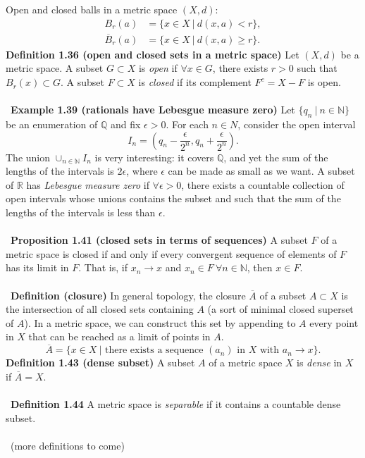 \documentclass[12 pt]{article}
\newcommand{\R}{\mathbb{R}}
\newcommand{\Q}{\mathbb{Q}}
\newcommand{\N}{\mathbb{N}}
\newcommand{\LP}{\left(}
\newcommand{\RP}{\right)}
\numberwithin{equation}{section}
\begin{document}
{Open and closed balls in a metric space $(X,d)$: \begin{align*}
B_r(a) & = \{ x \in X \ | \ d(x,a) < r \}, \\
\overline{B}_r(a) & = \{ x \in X \ | \ d(x,a) \geq r \}.
\end{align*}
\textbf{Definition 1.36 (open and closed sets in a metric space)} Let $(X, d)$ be a metric space. A subset $G \subset X$ is \textit{open} if $\forall x \in G$, there exists $r > 0$ such that $B_r(x) \subset G$. A subset $F \subset X$ is \textit{closed} if its complement $F^c = X - F$ is open.\\
\\
\
\textbf{Example 1.39 (rationals have Lebesgue measure zero)} Let $\{q_n \ | \ n \in \N\}$ be an enumeration of $\Q$ and fix $\epsilon > 0$. For each $n \in N$, consider the open interval \begin{equation*}
I_n = \LP q_n - \frac{\epsilon}{2^n}, q_n + \frac{\epsilon}{2^n} \RP.
\end{equation*}
The union $\cup_{n \in \N} I_n$ is very interesting: it covers $\Q$, and yet the sum of the lengths of the intervals is $2\epsilon$, where $\epsilon$ can be made as small as we want. A subset of $\R$ has \textit{Lebesgue measure zero} if $\forall \epsilon > 0$, there exists a countable collection of open intervals whose unions contains the subset and such that the sum of the lengths of the intervals is less than $\epsilon$.\\
\\
\
\textbf{Proposition 1.41 (closed sets in terms of sequences)} A subset $F$ of a metric space is closed if and only if every convergent sequence of elements of $F$ has its limit in $F$. That is, if $x_n \to x$ and $x_n \in F \ \forall n \in \N$, then $x \in F$.\\
\\
\
\textbf{Definition (closure)} In general topology, the closure $\overline{A}$ of a subset $A \subset X$ is the intersection of all closed sets containing $A$ (a sort of minimal closed superset of $A$). In a metric space, we can construct this set by appending to $A$ every point in $X$ that can be reached as a limit of points in $A$. \begin{equation*}
\overline{A} = \{ x \in X \ | \mbox{ there exists a sequence } (a_n) \mbox{ in } X \mbox{ with } a_n \to x \}.
\end{equation*}
\textbf{Definition 1.43 (dense subset)} A subset $A$ of a metric space $X$ is \textit{dense} in $X$ if $\overline{A} = X$.\\
\\
\
\textbf{Definition 1.44} A metric space is \textit{separable} if it contains a countable dense subset.\\
\\
\
(more definitions to come)












}
\end{document}
